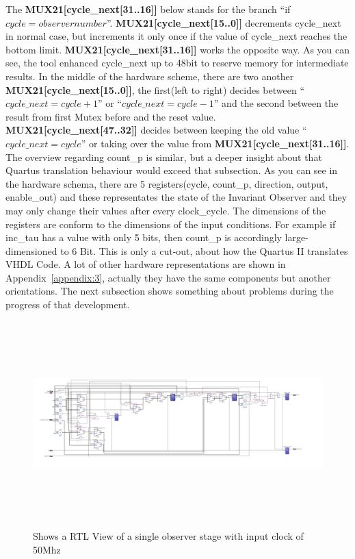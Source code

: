 The \textbf{MUX21[cycle\_next[31..16]]} below stands for the branch ``if $cycle=observernumber$''. 
\textbf{MUX21[cycle\_next[15..0]]} decrements cycle\_next in normal case, but increments it only once if the value of cycle\_next reaches the bottom limit. 
\textbf{MUX21[cycle\_next[31..16]]} works the opposite way. 
As you can see, the tool enhanced cycle\_next up to 48bit to reserve memory for intermediate results.
In the middle of the hardware scheme, there are two another \textbf{MUX21[cycle\_next[15..0]]}, 
the first(left to right) decides between  ``$cycle\_next=cycle+1$'' or ``$cycle\_next=cycle-1$'' and the second 
between the result from first Mutex before and the reset value. \textbf{MUX21[cycle\_next[47..32]]} decides between keeping the old value ``$cycle\_next=cycle$'' or 
taking over the value from \textbf{MUX21[cycle\_next[31..16]]}. The overview regarding count\_p is similar, but a deeper insight about that Quartus translation behaviour would exceed that subsection. 
As you can see in the hardware schema, there are 5 registers(cycle, count\_p, direction, output, enable\_out) 
and these representates the state of the Invariant Observer and they may only change their values after every clock\_cycle. 
The dimensions of the registers are conform to the dimensions of the input conditions. 
For example if inc\_tau has a value with only 5 bits, then count\_p is accordingly large-dimensioned to 6 Bit. 
This is only a cut-out, about how the Quartus II translates VHDL Code. 
A lot of other hardware representations are shown in Appendix~\ref{appendix:3}, actually they have the same components but another orientations. 
The next subsection shows something about problems during the progress of that development. 

\begin{figure}[]
\centering
\includegraphics[width=650px,height=300px,angle=-90]{../../pictures/22.02.2014/onlyObserver/OBS_50M.jpg}
\caption[RTL View of Observer 0 with clock 50Mhz]{Shows a RTL View of a single observer stage with input clock of 50Mhz}
\label{fig:test:only:50:obs0}
\end{figure}

